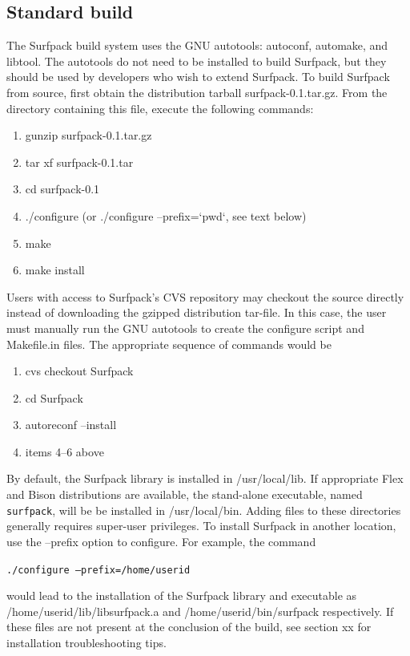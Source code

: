 \documentclass{article}
\begin{document}
\subsection{Standard build}
The Surfpack build system uses the GNU autotools: autoconf, automake, and libtool.  The autotools do not need to be installed to build Surfpack, but they should be used by developers who wish to extend Surfpack.  To build Surfpack from source, first obtain the distribution tarball surfpack-0.1.tar.gz.  From the directory containing this file, execute the following commands:
\begin{enumerate}
\item gunzip surfpack-0.1.tar.gz
\item tar xf surfpack-0.1.tar
\item cd surfpack-0.1
\item ./configure  (or ./configure --prefix=`pwd`, see text below)
\item make
\item make install
\end{enumerate}

Users with access to Surfpack's CVS repository may checkout the source directly instead of downloading the gzipped distribution tar-file.  In this case, the user must manually run the GNU autotools to create the configure script and Makefile.in files.  The appropriate sequence of commands would be
\begin{enumerate}
\item cvs checkout Surfpack
\item cd Surfpack
\item autoreconf --install
\item items 4--6 above
\end{enumerate}
By default, the Surfpack library is installed in /usr/local/lib.  If appropriate Flex and Bison distributions are available, the stand-alone executable, named \texttt{surfpack}, will be be installed in /usr/local/bin.  Adding files to these directories generally requires super-user privileges.  To install Surfpack in another location, use the --prefix option to configure.  For example, the command

\texttt{./configure --prefix=/home/userid}

would lead to the installation of the Surfpack library and executable as /home/userid/lib/libsurfpack.a and /home/userid/bin/surfpack respectively. If these files are not present at the conclusion of the build, see section xx for installation troubleshooting tips.
\end{document}
